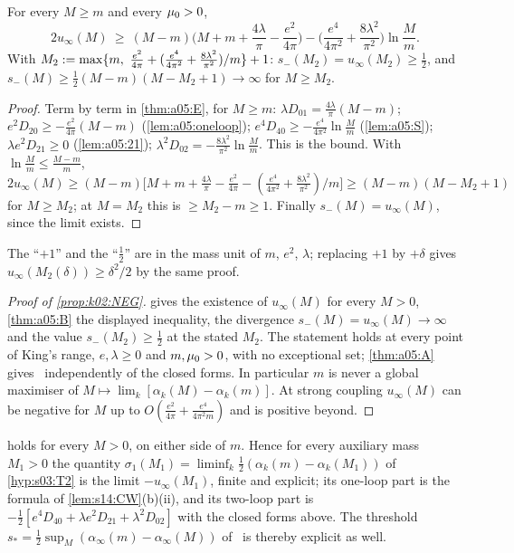\begin{theorem}\label{thm:a05:B}
For every $M\ge m$ and every $\mu_0>0$,
\[
2u_\infty(M)\ \ge\ (M-m)\Big(M+m+\frac{4\lambda}\pi-\frac{e^2}{4\pi}\Big)-\Big(\frac{e^4}{4\pi^2}+\frac{8\lambda^2}{\pi^2}\Big)\ln\frac Mm .
\]
With $M_2\defeq\max\{m,\ \frac{e^2}{4\pi}+(\frac{e^4}{4\pi^2}+\frac{8\lambda^2}{\pi^2})/m\}+1$: $s_-(M_2)=u_\infty(M_2)\ge\frac12$, and $s_-(M)\ge\frac12(M-m)(M-M_2+1)\to\infty$ for $M\ge M_2$.
\end{theorem}
\begin{proof}
Term by term in \cref{thm:a05:E}, for $M\ge m$: $\lambda D_{01}=\frac{4\lambda}\pi(M-m)$; $e^2D_{20}\ge-\frac{e^2}{4\pi}(M-m)$ (\cref{lem:a05:oneloop}); $e^4D_{40}\ge-\frac{e^4}{4\pi^2}\ln\frac Mm$ (\cref{lem:a05:S}); $\lambda e^2D_{21}\ge0$ (\cref{lem:a05:21}); $\lambda^2D_{02}=-\frac{8\lambda^2}{\pi^2}\ln\frac Mm$. This is the bound. With $\ln\frac Mm\le\frac{M-m}m$, $2u_\infty(M)\ge(M-m)\big[M+m+\frac{4\lambda}\pi-\frac{e^2}{4\pi}-(\frac{e^4}{4\pi^2}+\frac{8\lambda^2}{\pi^2})/m\big]\ge(M-m)(M-M_2+1)$ for $M\ge M_2$; at $M=M_2$ this is $\ge M_2-m\ge1$. Finally $s_-(M)=u_\infty(M)$, since the limit exists.
\end{proof}
The ``$+1$'' and the ``$\frac12$'' are in the mass unit of $m$, $e^2$, $\lambda$; replacing $+1$ by $+\delta$ gives $u_\infty(M_2(\delta))\ge\delta^2/2$ by the same proof.

\begin{proof}[Proof of \cref{prop:k02:NEG}]
 gives the existence of $u_\infty(M)$ for every $M>0$, \cref{thm:a05:B} the displayed inequality, the divergence $s_-(M)=u_\infty(M)\to\infty$ and the value $s_-(M_2)\ge\frac12$ at the stated $M_2$. The statement holds at every point of King's range, $e,\lambda\ge0$ and $m,\mu_0>0$, with no exceptional set; \cref{thm:a05:A} gives \NEGinf\ independently of the closed forms. In particular $m$ is never a global maximiser of $M\mapsto\lim_k[\alpha_k(M)-\alpha_k(m)]$. At strong coupling $u_\infty(M)$ can be negative for $M$ up to $O(\frac{e^2}{4\pi}+\frac{e^4}{4\pi^2m})$ and is positive beyond.
\end{proof}

\begin{remark}\label{rem:a05:T2}
 holds for every $M>0$, on either side of $m$. Hence for every auxiliary mass $M_1>0$ the quantity $\sigma_1(M_1)=\liminf_k\frac12(\alpha_k(m)-\alpha_k(M_1))$ of \cref{hyp:s03:T2} is the limit $-u_\infty(M_1)$, finite and explicit; its one-loop part is the formula of \cref{lem:s14:CW}(b)(ii), and its two-loop part is $-\frac12[e^4D_{40}+\lambda e^2D_{21}+\lambda^2D_{02}]$ with the closed forms above. The threshold $s_*=\frac12\sup_M(\alpha_\infty(m)-\alpha_\infty(M))$ of \RW\ is thereby explicit as well.
\end{remark}
